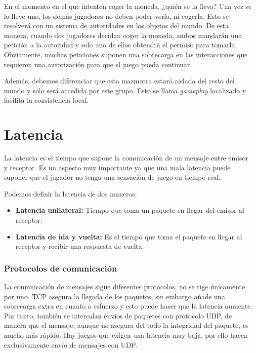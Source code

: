 \documentclass[runningheads]{llncs}
\begin{document}
En el momento en el que intenten coger la moneda, ¿quién se la lleva? Una vez se lo lleve uno, los demás jugadores no deben poder verla, ni cogerla.
Esto se resolverá con un sistema de autoridades en los objetos del mundo.
De esta manera, cuando dos jugadores decidan coger la moneda, ambos mandarán una petición a la autoridad y solo uno de ellos obtendrá el permiso para tomarla.
Obviamente, muchas peticiones suponen una sobrecarga  en las interacciones que requieren una autorización para que el juego pueda continuar.

Además, debemos diferenciar que esta mazmorra estará aislada del resto del mundo y solo será accedida por este grupo.
Esto se llama \textit{gameplay} localizado y facilita la consistencia local.

\section{Latencia}

La latencia es el tiempo que supone la comunicación de un mensaje entre emisor y receptor.
Es un aspecto muy importante ya que una mala latencia puede suponer que el jugador no tenga una sensación de juego en tiempo real.

\pagebreak

Podemos definir la latencia de dos maneras:~\cite{dge_mmosg}

\begin{itemize}
	\item\textbf{Latencia unilateral:}
		Tiempo que toma un paquete en llegar del emisor al receptor.
	\item\textbf{Latencia de ida y vuelta:}
		Es el tiempo que toma el paquete en llegar al receptor y recibir una respuesta de vuelta.
\end{itemize}

\subsubsection{Protocolos de comunicación}

La comunicación de mensajes sigue diferentes protocolos, no se rige únicamente por uno.
TCP asegura la llegada de los paquetes, sin embargo añade una sobrecarga extra en cuanto a esfuerzo y esto puede hacer que la latencia aumente.
Por tanto, también se intercalan envíos de paquetes con protocolo UDP, de manera que el mensaje, aunque no asegura del todo la integridad del paquete, es mucho más rápido.
Hay juegos que exigen una latencia muy baja, por ello hacen exclusivamente envío de mensajes con UDP\@.
\end{document}
